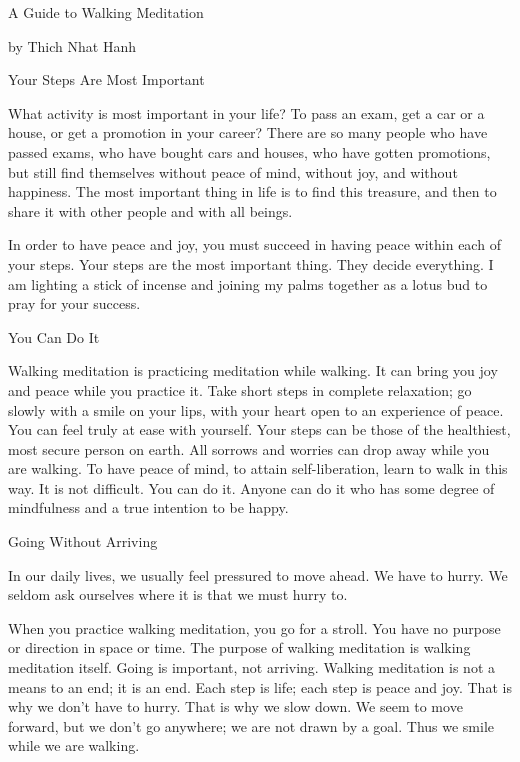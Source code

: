  A Guide to Walking Meditation

 

 
 by Thich Nhat Hanh

 

Your Steps Are Most Important

What activity is most important in your life?  To pass an exam, get a car or a house, or get a promotion in your career?  There are so many people who have passed exams, who have bought cars and houses, who have gotten promotions, but still find themselves without peace of mind, without joy, and without happiness.  The most important thing in life is to find this treasure, and then to share it with other people and with all beings. 

In order to have peace and joy, you must succeed in having peace within each of your steps.  Your steps are the most important thing.  They decide everything.  I am lighting a stick of incense and joining my palms together as a lotus bud to pray for your success.

 

You Can Do It

Walking meditation is practicing meditation while walking.  It can bring you joy and peace while you practice it.  Take short steps in complete relaxation; go slowly with a smile on your lips, with your heart open to an experience of peace.  You can feel truly at ease with yourself.  Your steps can be those of the healthiest, most secure person on earth.  All sorrows and worries can drop away while you are walking.  To have peace of mind, to attain self-liberation, learn to walk in this way.  It is not difficult.  You can do it.  Anyone can do it who has some degree of mindfulness and a true intention to be happy.

 

Going Without Arriving

In our daily lives, we usually feel pressured to move ahead.  We have to hurry.  We seldom ask ourselves where it is that we must hurry to. 

When you practice walking meditation, you go for a stroll.  You have no purpose or direction in space or time.  The purpose of walking meditation is walking meditation itself.  Going is important, not arriving.  Walking meditation is not a means to an end; it is an end.  Each step is life; each step is peace and joy.  That is why we don’t have to hurry.  That is why we slow down.  We seem to move forward, but we don’t go anywhere; we are not drawn by a goal.  Thus we smile while we are walking.

